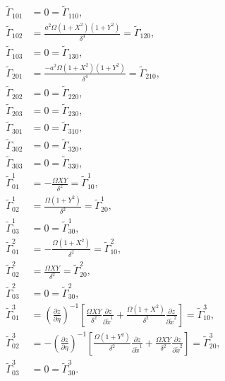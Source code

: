 \documentclass{article}
\begin{document}
\begin{align}
\tilde{\Gamma}_{101}&=0=\tilde{\Gamma}_{110}, \\
\tilde{\Gamma}_{102}&=\frac{a^2\Omega (1+X^2)(1+Y^2)}{\delta^4}=\tilde{\Gamma}_{120}, \\
\tilde{\Gamma}_{103}&=0=\tilde{\Gamma}_{130}, \\
\tilde{\Gamma}_{201}&=\frac{-a^2\Omega (1+X^2)(1+Y^2)}{\delta^4}=\tilde{\Gamma}_{210}, \\
\tilde{\Gamma}_{202}&=0=\tilde{\Gamma}_{220}, \\
\tilde{\Gamma}_{203}&=0=\tilde{\Gamma}_{230}, \\
\tilde{\Gamma}_{301}&=0=\tilde{\Gamma}_{310}, \\
\tilde{\Gamma}_{302}&=0=\tilde{\Gamma}_{320}, \\
\tilde{\Gamma}_{303}&=0=\tilde{\Gamma}_{330}, \\
\tilde{\Gamma}^1_{01}&=-\frac{\Omega XY}{\delta^2}=\tilde{\Gamma}^1_{10}, \\
\tilde{\Gamma}^1_{02}&=\frac{\Omega (1+Y^2)}{\delta^2}=\tilde{\Gamma}^1_{20}, \\
\tilde{\Gamma}^1_{03}&=0=\tilde{\Gamma}^1_{30}, \\
\tilde{\Gamma}^2_{01}&=-\frac{\Omega (1+X^2)}{\delta^2}=\tilde{\Gamma}^2_{10}, \\
\tilde{\Gamma}^2_{02}&=\frac{\Omega XY}{\delta^2}=\tilde{\Gamma}^2_{20}, \\
\tilde{\Gamma}^2_{03}&=0=\tilde{\Gamma}^2_{30}, \\
\tilde{\Gamma}^3_{01}&=\left(\frac{\partial z}{\partial \eta}\right)^{-1}\left[ \frac{\Omega XY}{\delta^2} \frac{\partial z}{\partial \tilde{x}^1}+ \frac{\Omega (1+X^2)}{\delta^2} \frac{\partial z}{\partial \tilde{x}^2}  \right]=\tilde{\Gamma}^3_{10}, \\
\tilde{\Gamma}^3_{02}&=-\left(\frac{\partial z}{\partial \eta}\right)^{-1}\left[ \frac{\Omega (1+Y^2)}{\delta^2} \frac{\partial z}{\partial \tilde{x}^1}+\frac{\Omega XY}{\delta^2}\frac{\partial z}{\partial \tilde{x}^2}  \right]=\tilde{\Gamma}^3_{20}, \\
\tilde{\Gamma}^3_{03}&=0=\tilde{\Gamma}^3_{30}.
\end{align}
\end{document}
